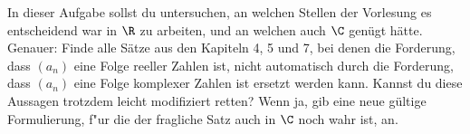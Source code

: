 \begin{prob}
  In dieser Aufgabe sollst du untersuchen, an welchen Stellen der Vorlesung es
  entscheidend war in $\R$ zu arbeiten, und an welchen auch $\C$ genügt hätte.
  Genauer: Finde alle Sätze aus den Kapiteln 4, 5 und 7, bei denen die
  Forderung, dass $(a_n)$ eine Folge reeller Zahlen ist, nicht automatisch durch
  die Forderung, dass $(a_n)$ eine Folge komplexer Zahlen ist ersetzt werden
  kann. Kannst du diese Aussagen trotzdem leicht modifiziert retten? Wenn ja,
  gib eine neue gültige Formulierung, f"ur die der fragliche Satz auch in $\C$
  noch wahr ist, an.
\end{prob}
